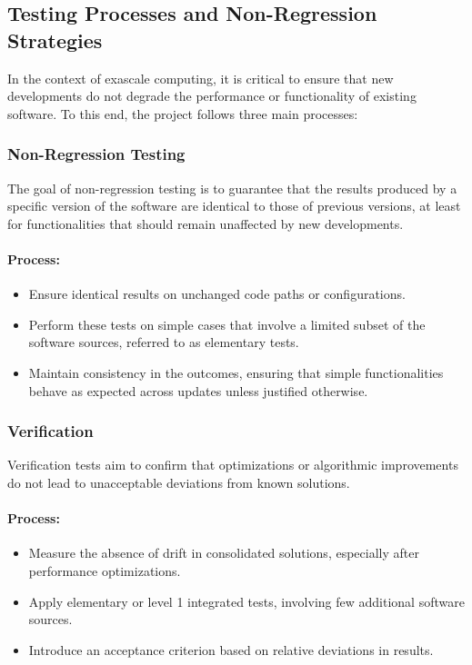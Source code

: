 \subsection{Testing Processes and Non-Regression Strategies}
\label{sec:testing-processes}

In the context of exascale computing, it is critical to ensure that new developments do not degrade the performance or functionality of existing software. To this end, the \exama project follows three main processes:

\subsubsection{Non-Regression Testing}
\label{sec:non-regression}

The goal of non-regression testing is to guarantee that the results produced by a specific version of the software are identical to those of previous versions, at least for functionalities that should remain unaffected by new developments.

\paragraph{Process:}
\begin{itemize}
    \item Ensure identical results on unchanged code paths or configurations.
    \item Perform these tests on simple cases that involve a limited subset of the software sources, referred to as elementary tests.
    \item Maintain consistency in the outcomes, ensuring that simple functionalities behave as expected across updates unless justified otherwise.
\end{itemize}

\subsubsection{Verification}
\label{sec:verification}

Verification tests aim to confirm that optimizations or algorithmic improvements do not lead to unacceptable deviations from known solutions.

\paragraph{Process:}
\begin{itemize}
    \item Measure the absence of drift in consolidated solutions, especially after performance optimizations.
    \item Apply elementary or level 1 integrated tests, involving few additional software sources.
    \item Introduce an acceptance criterion based on relative deviations in results.
\end{itemize}

